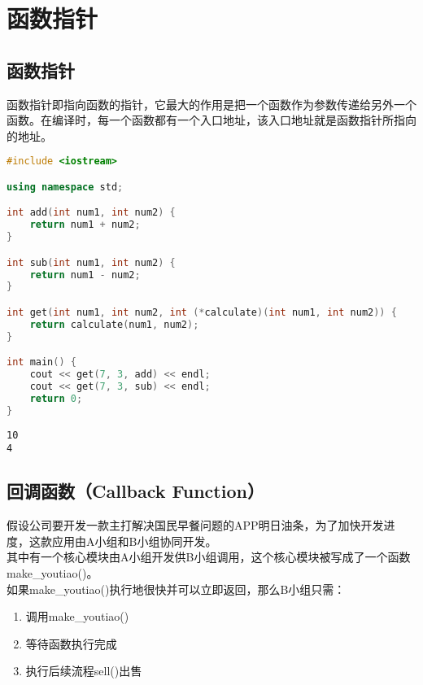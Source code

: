 \newpage

\section{函数指针}

\subsection{函数指针}

函数指针即指向函数的指针，它最大的作用是把一个函数作为参数传递给另外一个函数。在编译时，每一个函数都有一个入口地址，该入口地址就是函数指针所指向的地址。 \\


\begin{lstlisting}[language=C++]
#include <iostream>

using namespace std;

int add(int num1, int num2) {
    return num1 + num2;
}

int sub(int num1, int num2) {
    return num1 - num2;
}

int get(int num1, int num2, int (*calculate)(int num1, int num2)) {
    return calculate(num1, num2);
}

int main() {
    cout << get(7, 3, add) << endl;
    cout << get(7, 3, sub) << endl;
    return 0;
}
\end{lstlisting}

\begin{tcolorbox}
    \begin{verbatim}
10
4
	\end{verbatim}
\end{tcolorbox}

\subsection{回调函数（Callback Function）}

假设公司要开发一款主打解决国民早餐问题的APP明日油条，为了加快开发进度，这款应用由A小组和B小组协同开发。 \\

其中有一个核心模块由A小组开发供B小组调用，这个核心模块被写成了一个函数make\_youtiao()。 \\

如果make\_youtiao()执行地很快并可以立即返回，那么B小组只需：

\begin{enumerate}
    \item 调用make\_youtiao()
    \item 等待函数执行完成
    \item 执行后续流程sell()出售
\end{enumerate}

